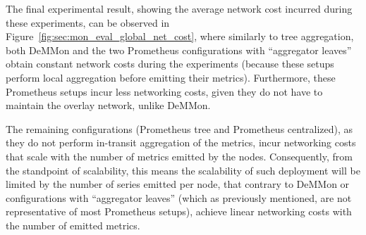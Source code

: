 The final experimental result, showing the average network cost incurred during these experiments, can be observed in Figure~\ref{fig:sec:mon_eval_global_net_cost}, where similarly to tree aggregation, both DeMMon and the two Prometheus configurations with ``aggregator leaves'' obtain constant network costs during the experiments (because these setups perform local aggregation before emitting their metrics). Furthermore, these Prometheus setups incur less networking costs, given they do not have to maintain the overlay network, unlike DeMMon. 

The remaining configurations (Prometheus tree and Prometheus centralized), as they do not perform in-transit aggregation of the metrics, incur networking costs that scale with the number of metrics emitted by the nodes. Consequently, from the standpoint of scalability, this means the scalability of such deployment will be limited by the number of series emitted per node, that contrary to DeMMon or configurations with ``aggregator leaves'' (which as previously mentioned, are not representative of most Prometheus setups), achieve linear networking costs with the number of emitted metrics.


